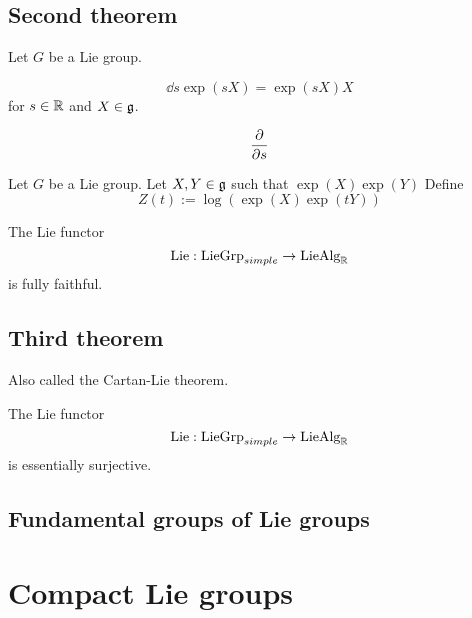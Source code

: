 \documentclass{../../large}
\begin{document}
\section{Second theorem}
\begin{prb}
Let $G$ be a Lie group.
\begin{parts}
\item
\[\dd{s}\exp(sX)=\exp(sX)X\]
for $s\in\mathbb{R}$ and $X\in\mathfrak{g}$.
\item
\[\pd{s}\]
\end{parts}
\end{prb}

\begin{prb}
Let $G$ be a Lie group.
Let $X,Y\in\mathfrak{g}$ such that $\exp(X)\exp(Y)$
Define
\[Z(t):=\log(\exp(X)\exp(tY))\]
\end{prb}

\begin{prb}[]
\begin{parts}
\item The Lie functor
\[\mathrm{Lie}:\mathrm{LieGrp}_{simple}\to\mathrm{LieAlg}_{\mathbb{R}}\]
is fully faithful.
\end{parts}
\end{prb}


\section{Third theorem}
\begin{prb}
\end{prb}

\begin{prb}
Also called the Cartan-Lie theorem.
\begin{parts}
\item The Lie functor
\[\mathrm{Lie}:\mathrm{LieGrp}_{simple}\to\mathrm{LieAlg}_{\mathbb{R}}\]
is essentially surjective.
\end{parts}
\end{prb}

\section{Fundamental groups of Lie groups}






\chapter{Compact Lie groups}
\end{document}
